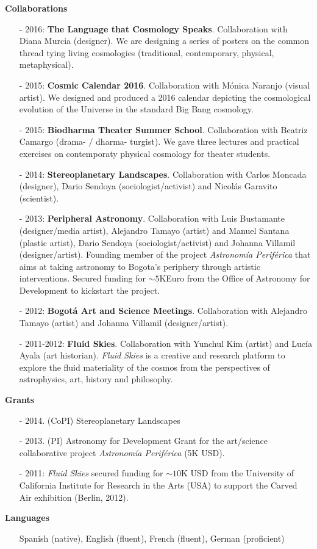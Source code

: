 \documentclass[letterpaper,11pt,onecolumn]{article}
\begin{document}
{\bf Collaborations}
\begin{itemize}
\item [-] 2016: {\bf The Language that Cosmology
  Speaks}. Collaboration with Diana Murcia (designer). We are
  designing a series of posters on the common thread tying living
  cosmologies (traditional, contemporary, physical, metaphysical). 
\item [-] 2015: {\bf Cosmic Calendar 2016}. Collaboration with M\'onica
  Naranjo (visual artist). We designed and produced a 2016 calendar
  depicting the cosmological evolution of the Universe in the standard
  Big Bang cosmology. 
\item [-] 2015: {\bf Biodharma Theater Summer School}. Collaboration
  with Beatriz Camargo (drama- / dharma- turgist). We gave three lectures and
  practical exercises on contemporaty physical cosmology for theater students.  
\item [-] 2014: {\bf Stereoplanetary Landscapes}. Collaboration with
  Carlos Moncada (designer), Dario Sendoya (sociologist/activist) and
  Nicol\'as Garavito (scientist).
\item [-] 2013: {\bf Peripheral Astronomy}. Collaboration with Luis
  Bustamante (designer/media artist), Alejandro Tamayo (artist) and Manuel
  Santana (plastic artist), Dario Sendoya (sociologist/activist) and
  Johanna Villamil (designer/artist).
  Founding member of the project \emph{Astronom\'ia
  Perif\'erica} that aims at taking astronomy to Bogota's periphery
  through artistic interventions.  Secured funding for $\sim 5$KEuro
  from the Office of Astronomy for Development to kickstart the
  project. 
\item [-] 2012: {\bf Bogot\'a Art and Science Meetings}. Collaboration
  with Alejandro Tamayo (artist) and Johanna Villamil
  (designer/artist). 
\item [-] 2011-2012: {\bf Fluid Skies}. Collaboration with Yunchul Kim
  (artist) and Luc\'ia Ayala (art historian). 
{\it Fluid Skies} is a creative and research platform to
  explore the fluid materiality of the cosmos from the perspectives of
  astrophysics, art, history and philosophy. 
\end{itemize}

{\bf Grants}
\begin{itemize}
\item[-] 2014. (CoPI) Stereoplanetary Landscapes
\item[-] 2013. (PI) Astronomy for Development Grant for the art/science collaborative project \emph{Astronom\'ia Perif\'erica} (5K USD). 
\item [-] 2011: {\it Fluid Skies} secured funding for $\sim 10$K USD
  from the University of California Institute for Research in the Arts
  (USA) to support the Carved Air exhibition (Berlin, 2012).
\end{itemize}


{\bf Languages}
\begin{itemize}
\item[]Spanish (native), English (fluent), French (fluent), German (proficient)
\end{itemize}
\end{document}

